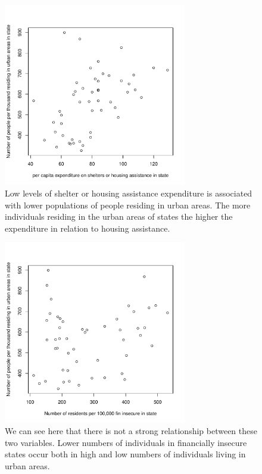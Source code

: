 \documentclass[12pt,letterpaper]{article}
\begin{document}
\begin{figure}[htp]
    \centering
    \includegraphics[width=8cm]{Y, X3 Graph.pdf}
    \caption{Low levels of shelter or housing assistance expenditure is associated with lower populations of people residing in urban areas. The more individuals residing in the urban areas of states the higher the expenditure in relation to housing assistance.
}
    \label{Y, X3}
\end{figure}

\begin{figure}[htp]
    \centering
    \includegraphics[width=8cm]{X2, X3 Graph.pdf}
    \caption{We can see here that there is not a strong relationship between these two variables. Lower numbers of individuals in financially insecure states occur both in high and low numbers of individuals living in urban areas.
}
    \label{x2, x3}
\end{figure}
\end{document}
